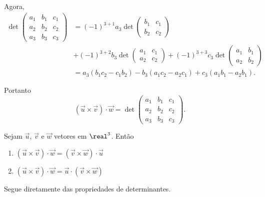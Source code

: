 Agora,
\begin{align*}
  \det \begin{pmatrix}
    a_1 & b_1 & c_1\\
    a_2 & b_2 & c_2\\
    a_3 & b_3 & c_3
  \end{pmatrix} & = (-1)^{3+1}a_3\det \begin{pmatrix}
    b_1 & c_1\\
    b_2 & c_2
  \end{pmatrix} \\ &+ (-1)^{3+2}b_3\det \begin{pmatrix}
    a_1 & c_1\\
    a_2 & c_2
  \end{pmatrix} + (-1)^{3+3}c_3\det \begin{pmatrix}
    a_1 & b_1\\
    a_2 & b_2
  \end{pmatrix}\\ &= a_3(b_1c_2 - c_1b_2) - b_3(a_1c_2 - a_2c_1) + c_3(a_1b_1 - a_2b_1).
\end{align*}

Portanto
\begin{equation}
  (\vec{u}\times\vec{v})\cdot\vec{w} = \det \begin{pmatrix}
    a_1 & b_1 & c_1\\
    a_2 & b_2 & c_2\\
    a_3 & b_3 & c_3
  \end{pmatrix}.
\end{equation}

\begin{proposicao}
  Sejam $\vec{u}$, $\vec{v}$ e $\vec{w}$ vetores em $\real^3$. Ent\~ao
  \begin{enumerate}
    \item $(\vec{u}\times\vec{v})\cdot\vec{w} = (\vec{v}\times\vec{w})\cdot\vec{u}$
    \item $(\vec{u}\times\vec{v})\cdot\vec{w} = \vec{u}\cdot(\vec{v}\times\vec{w})$
  \end{enumerate}
\end{proposicao}
\begin{prova}
  Segue diretamente das propriedades de determinantes.
\end{prova}


